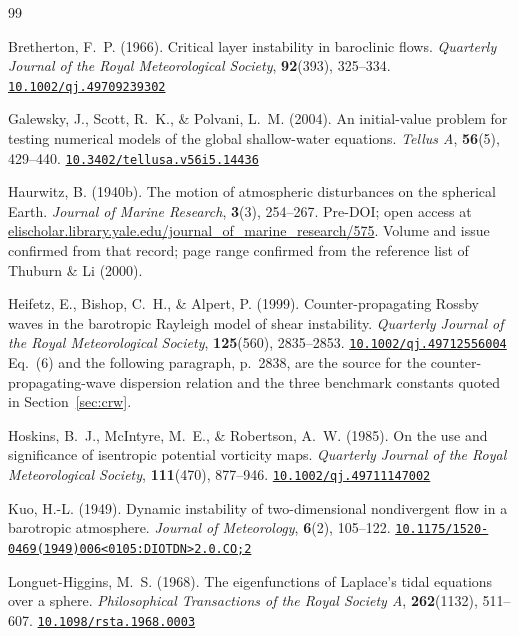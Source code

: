 \documentclass[11pt,a4paper]{article}
\newcommand{\doilink}[1]{\href{https://doi.org/#1}{\nolinkurl{#1}}}
\begin{document}
\begin{thebibliography}{99}

Bretherton, F.~P. (1966).
Critical layer instability in baroclinic flows.
\emph{Quarterly Journal of the Royal Meteorological Society}, \textbf{92}(393),
325--334. \doilink{10.1002/qj.49709239302}

Galewsky, J., Scott, R.~K., \& Polvani, L.~M. (2004).
An initial-value problem for testing numerical models of the global
shallow-water equations.
\emph{Tellus A}, \textbf{56}(5), 429--440.
\doilink{10.3402/tellusa.v56i5.14436}

Haurwitz, B. (1940b).
The motion of atmospheric disturbances on the spherical Earth.
\emph{Journal of Marine Research}, \textbf{3}(3), 254--267.
Pre-DOI; open access at
\href{https://elischolar.library.yale.edu/journal_of_marine_research/575/}%
{elischolar.library.yale.edu/journal\_of\_marine\_research/575}.
Volume and issue confirmed from that record; page range confirmed from the
reference list of Thuburn \& Li (2000).

Heifetz, E., Bishop, C.~H., \& Alpert, P. (1999).
Counter-propagating Rossby waves in the barotropic Rayleigh model of shear
instability.
\emph{Quarterly Journal of the Royal Meteorological Society}, \textbf{125}(560),
2835--2853. \doilink{10.1002/qj.49712556004}
Eq.~(6) and the following paragraph, p.~2838, are the source for the
counter-propagating-wave dispersion relation and the three benchmark constants
quoted in Section~\ref{sec:crw}.

Hoskins, B.~J., McIntyre, M.~E., \& Robertson, A.~W. (1985).
On the use and significance of isentropic potential vorticity maps.
\emph{Quarterly Journal of the Royal Meteorological Society}, \textbf{111}(470),
877--946. \doilink{10.1002/qj.49711147002}

Kuo, H.-L. (1949).
Dynamic instability of two-dimensional nondivergent flow in a barotropic
atmosphere.
\emph{Journal of Meteorology}, \textbf{6}(2), 105--122.
\doilink{10.1175/1520-0469(1949)006<0105:DIOTDN>2.0.CO;2}

Longuet-Higgins, M.~S. (1968).
The eigenfunctions of Laplace's tidal equations over a sphere.
\emph{Philosophical Transactions of the Royal Society A}, \textbf{262}(1132),
511--607. \doilink{10.1098/rsta.1968.0003}


\end{thebibliography}
\end{document}
